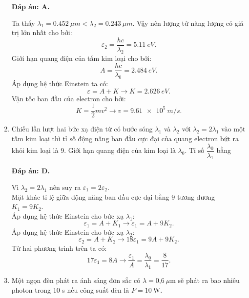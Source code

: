 \begin{enumerate}[label=\bfseries Câu \arabic*:]
	\loigiai
	{		\textbf{Đáp án: A.}
		
Ta thấy $ \lambda_{1} = \SI{0,452}{\mu m} < \lambda_{2} = \SI{0,243}{\mu m}$. Vậy nên lượng tử năng lượng có giá trị lớn nhất cho bởi:
$$
	\varepsilon_{2} = \dfrac{hc}{\lambda_{2}} = \SI{5,11}{eV}.
$$
Giới hạn quang điện của tấm kim loại cho bởi:
$$
	A = \dfrac{hc}{\lambda_{0}} = \SI{2,484}{eV}.
$$
Áp dụng hệ thức Einstein ta có:
$$
	\varepsilon = A + K \rightarrow K = \SI{2,626}{eV}.
$$
Vận tốc ban đầu của electron cho bởi:
$$
	K = \dfrac{1}{2}mv^{2} \rightarrow v = \SI{9,61 e5}{m/s}.
$$		
	}
	
	\item {} 
		\cauhoi
	{Chiếu lần lượt hai bức xạ điện từ có bước sóng $\lambda_1$ và $\lambda_2$ với $\lambda_2=2\lambda_1$  vào một tấm kim loại thì tỉ số động năng ban đầu cực đại của quang electron bứt ra khỏi kim loại là 9. Giới hạn quang điện của kim loại là $\lambda_0$. Tỉ số $\dfrac{\lambda_0}{\lambda_1}$ bằng
	}
	
	\loigiai
	{		\textbf{Đáp án: D.}

Vì $ \lambda_{2} = 2 \lambda_{1} $ nên suy ra $ \varepsilon_{1} = 2 \varepsilon_{2} $. \\
Mặt khác tỉ lệ giữa động năng ban đầu cực đại bằng $ 9 $ tương đương $ K_{1} = 9 K_{2}$. \\
Áp dụng hệ thức Einstein cho bức xạ $ \lambda_{1} $:
$$
	\varepsilon_{1} = A + K_{1} \rightarrow \varepsilon_{1} = A + 9 K_{2}.
$$
Áp dụng hệ thức Einstein cho bức xạ $ \lambda_{2} $:
$$
	\varepsilon_{2} = A + K_{2} \rightarrow 18\varepsilon_{1} = 9A + 9 K_{2}.
$$
Từ hai phương trình trên ta có:
$$
17 \varepsilon_{1} = 8A \rightarrow \dfrac{\varepsilon_{1}}{A} = \dfrac{\lambda_{0}}{\lambda_{1}} = \dfrac{8}{17}.
$$		
	}
	
	\item {} 
		\cauhoi
	{Một ngọn đèn phát ra ánh sáng đơn sắc có $\lambda=\text{0,6}\ \mu\text{m}$ sẽ phát ra bao nhiêu photon trong 10 s nếu công suất đèn là $P = 10\ \text{W}$.
	}
	

\end{enumerate}
